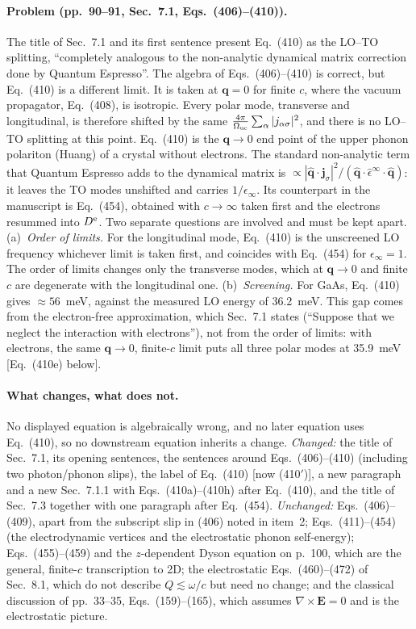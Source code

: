 \paragraph{Problem (pp.~90--91, Sec.~7.1, Eqs.~(406)--(410)).}
The title of Sec.~7.1 and its first sentence present Eq.~(410) as the LO--TO splitting,
``completely analogous to the non-analytic dynamical matrix correction done by Quantum Espresso''.
The algebra of Eqs.~(406)--(410) is correct, but Eq.~(410) is a different limit. It is taken at
$\mathbf q=0$ for finite $c$, where the vacuum propagator, Eq.~(408), is isotropic. Every polar
mode, transverse and longitudinal, is therefore shifted by the same
$\frac{4\pi}{\Omega_{\rm uc}}\sum_\alpha|j_{\alpha\sigma}|^2$, and there is no LO--TO splitting at
this point. Eq.~(410) is the $\mathbf q\to0$ end point of the upper phonon polariton (Huang) of a
crystal without electrons. The standard non-analytic term that Quantum Espresso adds to the
dynamical matrix is
$\propto|\hat{\mathbf q}\cdot\mathbf j_\sigma|^2/(\hat{\mathbf q}\cdot\hat\epsilon^\infty\cdot\hat{\mathbf q})$:
it leaves the TO modes unshifted and carries $1/\epsilon_\infty$. Its counterpart in the manuscript
is Eq.~(454), obtained with $c\to\infty$ taken first and the electrons resummed into $D^{\rm e}$.
Two separate questions are involved and must be kept apart.
(a)~\emph{Order of limits.} For the longitudinal mode, Eq.~(410) is the unscreened LO frequency
whichever limit is taken first, and coincides with Eq.~(454) for $\epsilon_\infty=1$. The order of limits changes
only the transverse modes, which at $\mathbf q\to0$ and finite $c$ are degenerate with the
longitudinal one.
(b)~\emph{Screening.} For GaAs, Eq.~(410) gives $\approx56$~meV, against the measured LO energy of
36.2~meV. This gap comes from the electron-free approximation, which Sec.~7.1 states (``Suppose
that we neglect the interaction with electrons''), not from the order of limits: with electrons,
the same $\mathbf q\to0$, finite-$c$ limit puts all three polar modes at 35.9~meV [Eq.~(410e) below].

\paragraph{What changes, what does not.}
No displayed equation is algebraically wrong, and no later equation uses Eq.~(410), so no
downstream equation inherits a change. \emph{Changed:} the title of Sec.~7.1, its opening
sentences, the sentences around Eqs.~(406)--(410) (including two photon/phonon slips), the label
of Eq.~(410) [now (410$'$)], a new paragraph and a new Sec.~7.1.1 with Eqs.~(410a)--(410h) after
Eq.~(410), and the title of Sec.~7.3 together with one paragraph after Eq.~(454).
\emph{Unchanged:} Eqs.~(406)--(409), apart from the subscript slip in (406) noted in item~2;
Eqs.~(411)--(454) (the electrodynamic vertices and the electrostatic phonon self-energy);
Eqs.~(455)--(459) and the $z$-dependent Dyson equation on p.~100, which are the general,
finite-$c$ transcription to 2D; the electrostatic Eqs.~(460)--(472) of Sec.~8.1, which do not
describe $Q\lesssim\omega/c$ but need no change; and the classical discussion of pp.~33--35,
Eqs.~(159)--(165), which assumes $\nabla\times\mathbf E=0$ and is the electrostatic picture.

